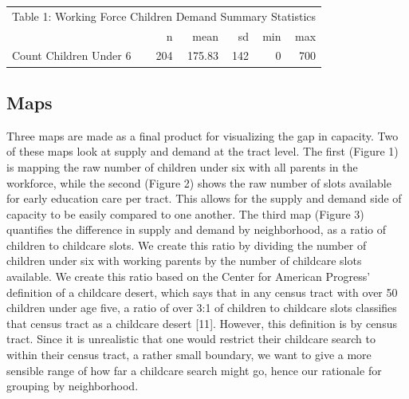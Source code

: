 \documentclass[10pt,letterpaper]{article}
\begin{document}
\begin{table}[!h]
\centering\begingroup\fontsize{10}{12}\selectfont

\begin{tabular}{l|r|r|r|r|r}
\hline
\multicolumn{6}{c|}{Table 1: Working Force Children Demand Summary Statistics} \\
\cline{1-6}
  & n & mean & sd & min & max\\
\hline
\rowcolor{gray!6}  Count Children Under 6 & 204 & 175.83 & 142 & 0 & 700\\
\hline
\end{tabular}
\endgroup{}
\end{table}

\subsection{Maps}\label{maps}

Three maps are made as a final product for visualizing the gap in
capacity. Two of these maps look at supply and demand at the tract
level. The first (Figure 1) is mapping the raw number of children under
six with all parents in the workforce, while the second (Figure 2) shows
the raw number of slots available for early education care per tract.
This allows for the supply and demand side of capacity to be easily
compared to one another. The third map (Figure 3) quantifies the
difference in supply and demand by neighborhood, as a ratio of children
to childcare slots. We create this ratio by dividing the number of
children under six with working parents by the number of childcare slots
available. We create this ratio based on the Center for American
Progress' definition of a childcare desert, which says that in any
census tract with over 50 children under age five, a ratio of over 3:1
of children to childcare slots classifies that census tract as a
childcare desert {[}11{]}. However, this definition is by census tract.
Since it is unrealistic that one would restrict their childcare search
to within their census tract, a rather small boundary, we want to give a
more sensible range of how far a childcare search might go, hence our
rationale for grouping by neighborhood.
\end{document}
